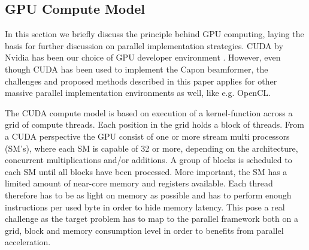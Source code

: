\documentclass[journal]{IEEEtran}
\begin{document}
\subsection{GPU Compute Model}
In this section we briefly discuss the principle behind GPU computing, laying the basis for further discussion on parallel implementation strategies. CUDA by Nvidia has been our choice of GPU developer environment \cite{Nvidia2011}. However, even though CUDA has been used to implement the Capon beamformer, the challenges and proposed methods described in this paper applies for other massive parallel implementation environments as well, like e.g. OpenCL. 

The CUDA compute model is based on execution of a kernel-function across a grid of compute threads. Each position in the grid holds a block of threads.
From a CUDA perspective the GPU consist of one or more stream multi processors (SM's), where each SM is capable of 32 or more, depending on the architecture, concurrent multiplications and/or additions. A group of blocks is scheduled to each SM until all blocks have been processed. More important, the SM has a limited amount of near-core memory and registers available. Each thread therefore has to be as light on memory as possible and has to perform enough instructions per used byte in order to hide memory latency. This pose a real challenge as the target problem has to map to the parallel framework both on a grid, block and memory consumption level in order to benefits from parallel acceleration.    


\end{document}
